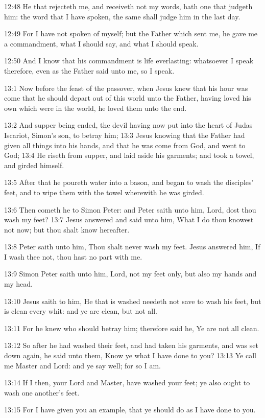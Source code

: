 12:48 He that rejecteth me, and receiveth not my words, hath one that judgeth him: the word that I have spoken, the same shall judge him in the last day.

12:49 For I have not spoken of myself; but the Father which sent me, he gave me a commandment, what I should say, and what I should speak.

12:50 And I know that his commandment is life everlasting: whatsoever I speak therefore, even as the Father said unto me, so I speak.

13:1 Now before the feast of the passover, when Jesus knew that his hour was come that he should depart out of this world unto the Father, having loved his own which were in the world, he loved them unto the end.

13:2 And supper being ended, the devil having now put into the heart of Judas Iscariot, Simon's son, to betray him; 13:3 Jesus knowing that the Father had given all things into his hands, and that he was come from God, and went to God; 13:4 He riseth from supper, and laid aside his garments; and took a towel, and girded himself.

13:5 After that he poureth water into a bason, and began to wash the disciples' feet, and to wipe them with the towel wherewith he was girded.

13:6 Then cometh he to Simon Peter: and Peter saith unto him, Lord, dost thou wash my feet?  13:7 Jesus answered and said unto him, What I do thou knowest not now; but thou shalt know hereafter.

13:8 Peter saith unto him, Thou shalt never wash my feet. Jesus answered him, If I wash thee not, thou hast no part with me.

13:9 Simon Peter saith unto him, Lord, not my feet only, but also my hands and my head.

13:10 Jesus saith to him, He that is washed needeth not save to wash his feet, but is clean every whit: and ye are clean, but not all.

13:11 For he knew who should betray him; therefore said he, Ye are not all clean.

13:12 So after he had washed their feet, and had taken his garments, and was set down again, he said unto them, Know ye what I have done to you?  13:13 Ye call me Master and Lord: and ye say well; for so I am.

13:14 If I then, your Lord and Master, have washed your feet; ye also ought to wash one another's feet.

13:15 For I have given you an example, that ye should do as I have done to you.

